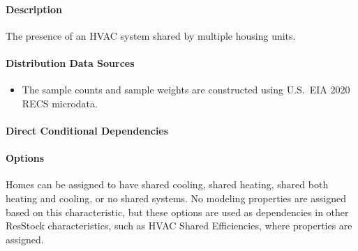 \paragraph{Description}
% 
The presence of an HVAC system shared by multiple housing units.

\paragraph{Distribution Data Sources}
% 
\begin{itemize}
\item The sample counts and sample weights are constructed using U.S.~EIA 2020 RECS microdata.
\end{itemize}

\paragraph{Direct Conditional Dependencies}


\paragraph{Options}
Homes can be assigned to have shared cooling, shared heating, shared both heating and cooling, or no shared systems. No modeling properties are assigned based on this characteristic, but these options are used as dependencies in other ResStock characteristics, such as HVAC Shared Efficiencies, where properties are assigned.

